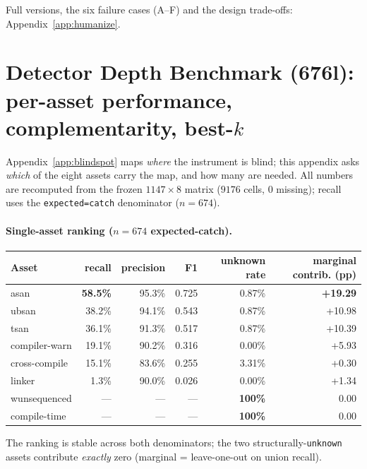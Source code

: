 Full versions, the six failure cases (A--F) and the design trade-offs: Appendix~\ref{app:humanize}.


\section{Detector Depth Benchmark (676l): per-asset performance, complementarity, best-$k$}
\label{app:bench676l}
Appendix~\ref{app:blindspot} maps \emph{where} the instrument is blind; this appendix asks
\emph{which} of the eight assets carry the map, and how many are needed. All numbers are recomputed
from the frozen $1147\times8$ matrix ($9176$ cells, $0$ missing); recall uses the
\texttt{expected=catch} denominator ($n{=}674$).

\paragraph{Single-asset ranking ($n{=}674$ expected-catch).}
\begin{center}\footnotesize
\begin{tabular}{@{}lrrrrr@{}}
\toprule
Asset & recall & precision & F1 & unknown rate & marginal contrib. (pp) \\
\midrule
asan & \textbf{58.5\%} & 95.3\% & 0.725 & 0.87\% & \textbf{+19.29} \\
ubsan & 38.2\% & 94.1\% & 0.543 & 0.87\% & +10.98 \\
tsan & 36.1\% & 91.3\% & 0.517 & 0.87\% & +10.39 \\
compiler-warn & 19.1\% & 90.2\% & 0.316 & 0.00\% & +5.93 \\
cross-compile & 15.1\% & 83.6\% & 0.255 & 3.31\% & +0.30 \\
linker & 1.3\% & 90.0\% & 0.026 & 0.00\% & +1.34 \\
wunsequenced & --- & --- & --- & \textbf{100\%} & 0.00 \\
compile-time & --- & --- & --- & \textbf{100\%} & 0.00 \\
\bottomrule
\end{tabular}
\end{center}
The ranking is stable across both denominators; the two structurally-\texttt{unknown} assets
contribute \emph{exactly} zero (marginal = leave-one-out on union recall).

